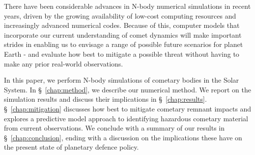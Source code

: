 There have been considerable advances in N-body numerical simulations in recent years, driven by the growing availability of low-cost computing resources and increasingly advanced numerical codes. Because of this, computer models that incorporate our current understanding of comet dynamics will make important strides in enabling us to envisage a range of possible future scenarios for planet Earth - and evaluate how best to mitigate a possible threat without having to make any prior real-world observations.


In this paper, we perform N-body simulations of cometary bodies in the Solar System. In \S~\ref{chap:method}, we describe our numerical method. We report on the simulation results and discuss their implications in \S~\ref{chap:results}. \S~\ref{chap:mitigation} discusses how best to mitigate cometary remnant impacts and explores a predictive model approach to identifying hazardous cometary material from current observations. We conclude with a summary of our results in \S~\ref{chap:conclusion}, ending with a discussion on the implications these have on the present state of planetary defence policy.
